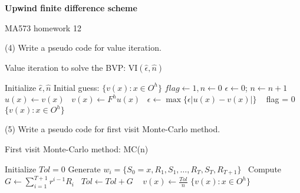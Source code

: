 \documentclass[12pt,a4paper]{ctexart}
\begin{document}
\begin{center}
\textbf{Upwind finite difference scheme}
\vspace{8pt}

MA573 homework 12
\end{center}

\vspace{12pt}
(4) Write a pseudo code for value iteration.

\begin{algorithm}[h]
\caption{Value iteration to solve the BVP: VI$(\hat{\epsilon}, \hat{n})$}
\begin{algorithmic}[1]
\STATE Initialize $\hat{\epsilon}, \hat{n}$
\STATE Initial guess: $\{v(x) : x \in O^{h}\}$
\STATE $flag \gets 1, n \gets 0$
\STATE $\epsilon \gets 0$; $n \gets n+1$ \
\STATE $u(x) \gets v(x)$ \
\STATE $v(x) \gets F^{h}u(x)$ \
\STATE $\epsilon \gets \max \{\epsilon | u(x) - v(x)| \}$ \
\IF{$\epsilon < \hat{\epsilon}$}
\STATE flag = 0
\ENDIF
\ENDFOR
\ENDWHILE
\RETURN $\{v(x): x \in O^{h}\}$
\end{algorithmic}
\end{algorithm}

(5) Write a pseudo code for first visit Monte-Carlo method.

\begin{algorithm}[h]
\caption{First visit Monte-Carlo method: MC(n)}
\begin{algorithmic}[1]
\STATE Initialize $Tol = 0$
\FOR{$x \in O^{h}$}
\FOR{$i = 1, 2 , \dots, n$}
\STATE Generate $w_{i} = \{S_{0} = x, R_{1}, S_{1}, \dots, R_{T}, S_{T}, R_{T+1}\}$ \
\STATE Compute $G \gets \sum_{i = 1}^{T+1}  r^{i-1} R_{i}$ \
\STATE $Tol \gets Tol + G$ \
\ENDFOR
\RETURN $v(x) \gets \frac{Tol}{n}$
\ENDFOR
\RETURN $\{v(x): x \in O^{h}\}$


\end{algorithmic}
\end{algorithm}
\end{document}
